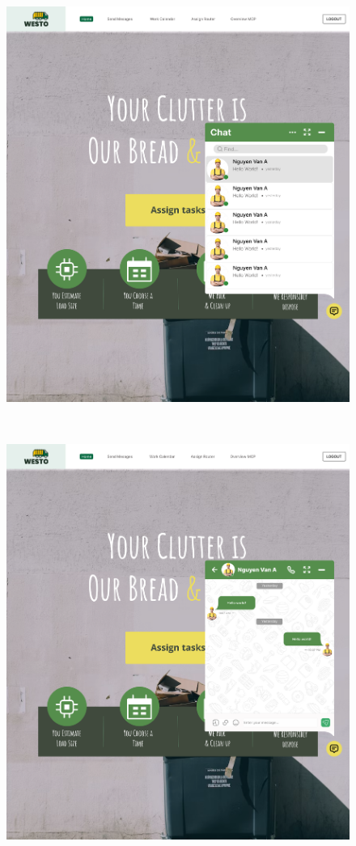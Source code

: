 \documentclass[a4paper]{article}
\begin{document}
\begin{enumerate}
\begin{figure}[!h]
        \includegraphics[width=6in]{Image/popup.png}
    \end{figure}\\
    \newpage
        \begin{figure}[!h]
        \centering
        \includegraphics[width=6in]{Image/popup1.png}
    \end{figure}
    \\


\end{enumerate}
\end{document}
